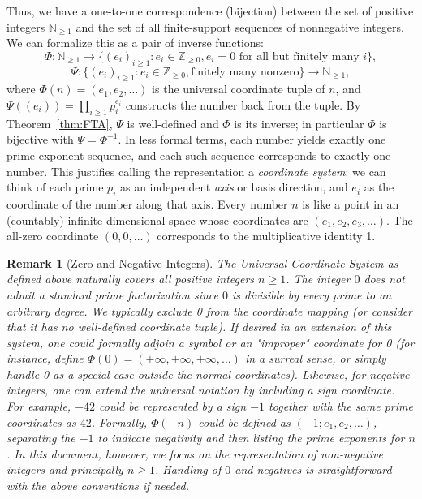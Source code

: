 \documentclass[11pt]{article}
\newtheorem{remark}{Remark}
\begin{document}
Thus, we have a one-to-one correspondence (bijection) between the set of positive integers $\mathbb{N}_{\ge 1}$ and the set of all finite-support sequences of nonnegative integers. We can formalize this as a pair of inverse functions:
\[
\Phi: \mathbb{N}_{\ge 1} \to \{(e_i)_{i\ge1}: e_i \in \mathbb{Z}_{\ge0}, e_i = 0 \text{ for all but finitely many }i\},
\] 
\[ 
\Psi: \{(e_i)_{i\ge1}: e_i \in \mathbb{Z}_{\ge0}, \text{finitely many nonzero}\} \to \mathbb{N}_{\ge 1},
\] 
where $\Phi(n) = (e_1,e_2,\ldots)$ is the universal coordinate tuple of $n$, and $\Psi((e_i)) = \prod_{i\ge1} p_i^{e_i}$ constructs the number back from the tuple. By Theorem~\ref{thm:FTA}, $\Psi$ is well-defined and $\Phi$ is its inverse; in particular $\Phi$ is bijective with $\Psi = \Phi^{-1}$. In less formal terms, each number yields exactly one prime exponent sequence, and each such sequence corresponds to exactly one number. This justifies calling the representation a \emph{coordinate system}: we can think of each prime $p_i$ as an independent \emph{axis} or basis direction, and $e_i$ as the coordinate of the number along that axis. Every number $n$ is like a point in an (countably) infinite-dimensional space whose coordinates are $(e_1, e_2, e_3,\dots)$. The all-zero coordinate $(0,0,\dots)$ corresponds to the multiplicative identity 1.

\begin{remark}[Zero and Negative Integers]
The Universal Coordinate System as defined above naturally covers all positive integers $n \ge 1$. The integer $0$ does not admit a standard prime factorization since $0$ is divisible by every prime to an arbitrary degree. We typically exclude 0 from the coordinate mapping (or consider that it has no well-defined coordinate tuple). If desired in an extension of this system, one could formally adjoin a symbol or an "improper" coordinate for 0 (for instance, define $\Phi(0) = (+\infty, +\infty, +\infty, \dots)$ in a surreal sense, or simply handle 0 as a special case outside the normal coordinates). Likewise, for negative integers, one can extend the universal notation by including a sign coordinate. For example, $-42$ could be represented by a sign $-1$ together with the same prime coordinates as $42$. Formally, $\Phi(-n)$ could be defined as $(-1; e_1, e_2, \ldots)$, separating the $-1$ to indicate negativity and then listing the prime exponents for $n$. In this document, however, we focus on the representation of non-negative integers and principally $n \ge 1$. Handling of $0$ and negatives is straightforward with the above conventions if needed.
\end{remark}
\end{document}
